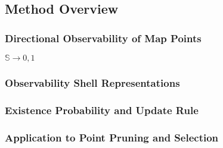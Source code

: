 \subsection{Method Overview}

\subsubsection{Directional Observability of Map Points}

$\mathbb{S}\rightarrow{0, 1}$

\subsubsection{Observability Shell Representations}

\subsubsection{Existence Probability and Update Rule}

\subsubsection{Application to Point Pruning and Selection}
